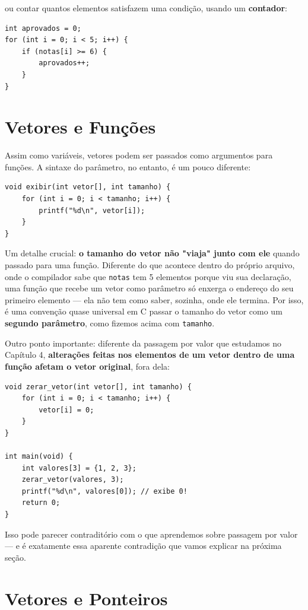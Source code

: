 \documentclass[12pt,a4paper,oneside]{extreport}
\begin{document}
ou contar quantos elementos satisfazem uma condição, usando um \textbf{contador}:

\begin{lstlisting}
int aprovados = 0;
for (int i = 0; i < 5; i++) {
    if (notas[i] >= 6) {
        aprovados++;
    }
}
\end{lstlisting}

\section{Vetores e Funções}
\label{sec:vetores-funcoes}

Assim como variáveis, vetores podem ser passados como argumentos para funções. A sintaxe do parâmetro, no entanto, é um pouco diferente:

\begin{lstlisting}
void exibir(int vetor[], int tamanho) {
    for (int i = 0; i < tamanho; i++) {
        printf("%d\n", vetor[i]);
    }
}
\end{lstlisting}

Um detalhe crucial: \textbf{o tamanho do vetor não "viaja" junto com ele} quando passado para uma função. Diferente do que acontece dentro do próprio arquivo, onde o compilador sabe que \texttt{notas} tem 5 elementos porque viu sua declaração, uma função que recebe um vetor como parâmetro só enxerga o endereço do seu primeiro elemento — ela não tem como saber, sozinha, onde ele termina. Por isso, é uma convenção quase universal em C passar o tamanho do vetor como um \textbf{segundo parâmetro}, como fizemos acima com \texttt{tamanho}.

Outro ponto importante: diferente da passagem por valor que estudamos no Capítulo 4, \textbf{alterações feitas nos elementos de um vetor dentro de uma função afetam o vetor original}, fora dela:

\begin{lstlisting}
void zerar_vetor(int vetor[], int tamanho) {
    for (int i = 0; i < tamanho; i++) {
        vetor[i] = 0;
    }
}

int main(void) {
    int valores[3] = {1, 2, 3};
    zerar_vetor(valores, 3);
    printf("%d\n", valores[0]); // exibe 0!
    return 0;
}
\end{lstlisting}

Isso pode parecer contraditório com o que aprendemos sobre passagem por valor — e é exatamente essa aparente contradição que vamos explicar na próxima seção.

\section{Vetores e Ponteiros}
\label{sec:vetores-ponteiros}
\end{document}
